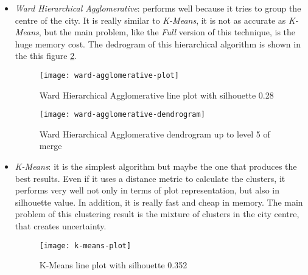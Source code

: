 \begin{itemize}
	\item \textit{Ward Hierarchical Agglomerative}: performs well because it tries to group the centre of the city. It is really similar to \textit{K-Means}, it is not as accurate as \textit{K-Means}, but the main problem, like the \textit{Full} version of this technique, is the huge memory cost. The dedrogram of this hierarchical algorithm is shown in the this figure \ref{fig:ward-agglomerative-dendrogram}. 
	
	\begin{figure}[bt]
		\centering
		\texttt{[image: ward-agglomerative-plot]}
		\caption{Ward Hierarchical Agglomerative line plot with silhouette 0.28}
		\label{fig:ward-agglomerative-line}
	\end{figure}
	
	\begin{figure}[bt]
		\centering
		\texttt{[image: ward-agglomerative-dendrogram]}
		\caption{Ward Hierarchical Agglomerative dendrogram up to level 5 of merge}
		\label{fig:ward-agglomerative-dendrogram}
	\end{figure}

	\item \textit{K-Means}: it is the simplest algorithm but maybe the one that produces the best results. Even if it uses a distance metric to calculate the clusters, it performs very well not only in terms of plot representation, but also in silhouette value. In addition, it is really fast and cheap in memory. The main problem of this clustering result is the mixture of clusters in the city centre, that creates uncertainty.
	
	\begin{figure}[bt]
		\centering
		\texttt{[image: k-means-plot]}
		\caption{K-Means line plot with silhouette 0.352}
		\label{fig:k-means-line}
	\end{figure}
	
\end{itemize}
